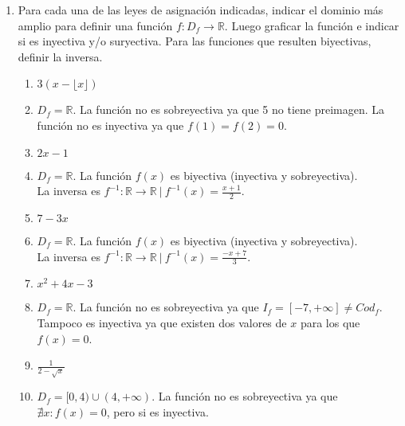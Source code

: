 \documentclass[a4paper]{article}
\newcommand{\answer}{\item[**]}
\newcommand{\exercise}{\item}
\begin{document}
\begin{enumerate}
\begin{enumerate} [label=(\alph*)]
		\item La función que va de cada provincia de Argentina a su capital, tomando como codominio el conjunto de las ciudades capitales de provincia.
		\answer La función relaciona provincia $\to$ capital. La función es sobreyectiva ya que no hay provincias sin capital y además es inyectiva ya que no hay dos provincias con la misma capital. Por lo tanto es biyectiva y se puede definir la función inversa que relaciona capital $\to$ provincia.

	\end{enumerate}

	\exercise Para cada una de las leyes de asignación indicadas, indicar el dominio más amplio para definir una función $f: D_{f} \to \mathbb{R}$. Luego graficar la función e indicar si es inyectiva y/o suryectiva. Para las funciones que resulten biyectivas, definir la inversa.
	\begin{multicols}{2}
	\begin{enumerate} [label=(\alph*)]
		\item $3(x-\lfloor x \rfloor)$
		\answer $D_f=\mathbb{R}$. La función no es sobreyectiva ya que 5 no tiene preimagen. La función no es inyectiva ya que $f(1)=f(2)=0$. 

		\item $2x-1$
		\answer $D_f=\mathbb{R}$. La función $f(x)$ es biyectiva (inyectiva y sobreyectiva). \\ La inversa es $f^{-1}:\mathbb{R} \to \mathbb{R} ~|~ f^{-1}(x)=\displaystyle{\frac{x+1}{2}}$. 

		\item $7-3x$
		\answer $D_f=\mathbb{R}$. La función $f(x)$ es biyectiva (inyectiva y sobreyectiva). \\ La inversa es $f^{-1}:\mathbb{R} \to \mathbb{R} ~|~ f^{-1}(x)=\displaystyle{\frac{-x+7}{3}}$. 

		\item $x^2+4x-3$
		\answer $D_f=\mathbb{R}$. La función no es sobreyectiva ya que $I_f=[-7,+\infty]\neq Cod_f$. Tampoco es inyectiva ya que existen dos valores de $x$ para los que $f(x)=0$.

		\item $\displaystyle{\frac{1}{2-\sqrt{x}}}$
		\answer $D_f=[0,4) \cup (4,+\infty)$. La función no es sobreyectiva ya que $\nexists x: f(x)=0$, pero si es inyectiva. 


\end{enumerate}
\end{multicols}
\end{enumerate}
\end{document}
